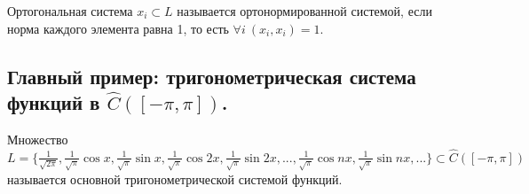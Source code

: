 \begin{definition}
    Ортогональная система ${x_i} \subset L$ называется ортонормированной системой, если норма каждого элемента равна 1, то есть $\forall i \> (x_i, x_i) = 1$.
\end{definition}


\subsection{Главный пример: тригонометрическая система функций в $\hat{C}([-\pi, \pi])$.}
\begin{definition}
    Множество $L = \{\frac{1}{\sqrt{2\pi}}, \frac{1}{\sqrt{\pi}} \cos x, \frac{1}{\sqrt{\pi}} \sin x, \frac{1}{\sqrt{\pi}} \cos 2x, \frac{1}{\sqrt{\pi}} \sin 2x, ..., \frac{1}{\sqrt{\pi}} \cos nx, \frac{1}{\sqrt{\pi}} \sin nx, ... \} \subset \hat{C}([-\pi,\pi])$ называется основной тригонометрической системой функций.
\end{definition}

